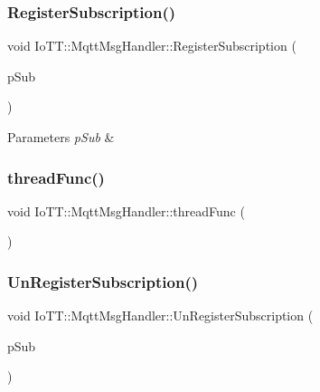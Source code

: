 \subsubsection{\texorpdfstring{Register\+Subscription()}{RegisterSubscription()}}
{\footnotesize\ttfamily void Io\+T\+T\+::\+Mqtt\+Msg\+Handler\+::\+Register\+Subscription (\begin{DoxyParamCaption}\item[{\hyperlink{classIoTT_1_1MqttSubscription}{Mqtt\+Subscription} $\ast$}]{p\+Sub }\end{DoxyParamCaption})}


\begin{DoxyParams}{Parameters}
{\em p\+Sub} & \\
\hline
\end{DoxyParams}
\mbox{\label{classIoTT_1_1MqttMsgHandler_a600695bb4d3736efd739ed4a35c3c7d3}} 
\subsubsection{\texorpdfstring{thread\+Func()}{threadFunc()}}
{\footnotesize\ttfamily void Io\+T\+T\+::\+Mqtt\+Msg\+Handler\+::thread\+Func (\begin{DoxyParamCaption}\item[{void}]{ }\end{DoxyParamCaption})\hspace{0.3cm}{\ttfamily [private]}}

\mbox{\label{classIoTT_1_1MqttMsgHandler_a20d87733262efb223015c856a8cfcfaf}} 
\subsubsection{\texorpdfstring{Un\+Register\+Subscription()}{UnRegisterSubscription()}}
{\footnotesize\ttfamily void Io\+T\+T\+::\+Mqtt\+Msg\+Handler\+::\+Un\+Register\+Subscription (\begin{DoxyParamCaption}\item[{\hyperlink{classIoTT_1_1MqttSubscription}{Mqtt\+Subscription} $\ast$}]{p\+Sub }\end{DoxyParamCaption})}


